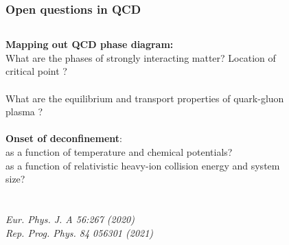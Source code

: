 \documentclass[aspectratio=1610]{beamer}
\begin{document}
\begin{frame}
\vspace*{-6mm}

\frametitle{Open questions in QCD}

\begin{columns}
\begin{column}{0.6\textwidth}
\textbf{Mapping out QCD phase diagram:}\\

What are the phases of strongly interacting matter? Location of critical point ? \\~\\
What are the equilibrium and transport properties of quark-gluon plasma ? \\~\\

\textbf{Onset of deconfinement}: \\
 as a function of temperature and chemical potentials? \\
 as a function of relativistic heavy-ion collision energy and system size?\\~\\~\\
\textit{Eur. Phys. J. A 56:267 (2020)}\\
 \textit{Rep. Prog. Phys. 84 056301 (2021)}\\
\end{column}
\begin{column}{0.4\textwidth}
    \begin{figure}
    \centering
    

\end{figure}
\end{column}
\end{columns}
\end{frame}
\end{document}
